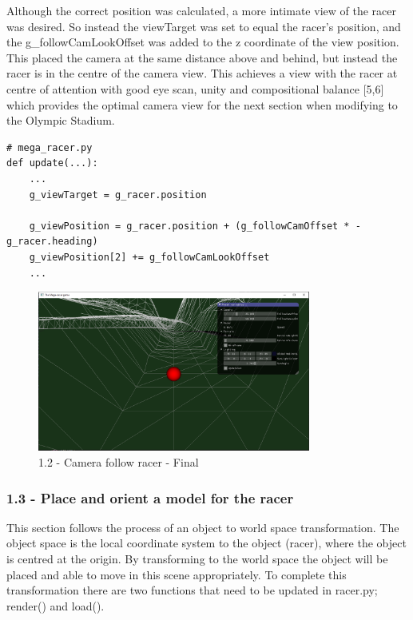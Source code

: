 \documentclass[a4 paper, 12pt]{article}
\begin{document}
Although the correct position was calculated, a more intimate view of the racer was desired. So instead the viewTarget was set to equal the racer's position, and the g\_followCamLookOffset was added to the z coordinate of the view position. This placed the camera at the same distance above and behind, but instead the racer is in the centre of the camera view. This achieves a view with the racer at centre of attention with good eye scan, unity and compositional balance [5,6] which provides the optimal camera view for the next section when modifying to the Olympic Stadium.
    \begin{lstlisting}
# mega_racer.py
def update(...):
    ...
    g_viewTarget = g_racer.position

    g_viewPosition = g_racer.position + (g_followCamOffset * -g_racer.heading)
    g_viewPosition[2] += g_followCamLookOffset
    ...
    \end{lstlisting}

    \begin{figure} [H]
        \centering
        \includegraphics[width=0.8\textwidth, frame]
            {./images/mega_racer/1.2_b.PNG}
        \caption{1.2 - Camera follow racer - Final}
    \end{figure}  


\subsubsection{1.3 - Place and orient a model for the racer}
This section follows the process of an object to world space transformation. The object space is the local coordinate system to the object (racer), where the object is centred at the origin. By transforming to the world space the object will be placed and able to move in this scene appropriately. To complete this transformation there are two functions that need to be updated in racer.py; render() and load(). 
\end{document}

